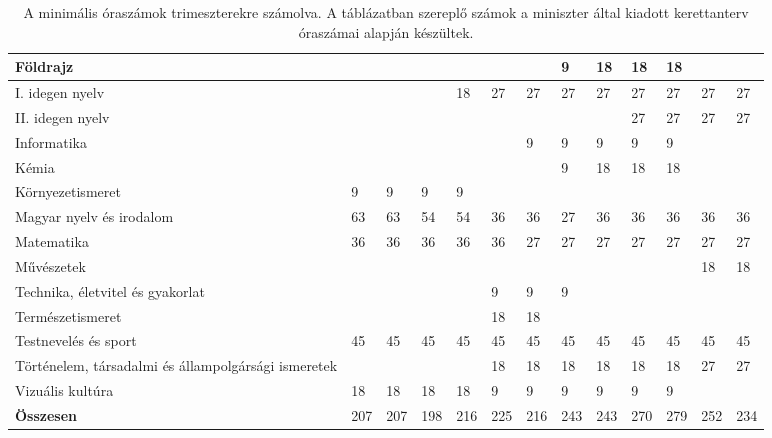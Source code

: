 \begin{landscape}
\begin{table}[]
\begin{tabular}{l|l|l|l|l|l|l|l|l|l|l|l|l}
    Földrajz                                            &     &     &     &     &     &     & 9   & 18  & 18  & 18  &     &     \\\hline
    I. idegen nyelv                                     &     &     &     & 18  & 27  & 27  & 27  & 27  & 27  & 27  & 27  & 27  \\\hline
    II. idegen nyelv                                    &     &     &     &     &     &     &     &     & 27  & 27  & 27  & 27  \\\hline
    Informatika                                         &     &     &     &     &     & 9   & 9   & 9   & 9   & 9   &     &     \\\hline
    Kémia                                               &     &     &     &     &     &     & 9   & 18  & 18  & 18  &     &     \\\hline
    Környezetismeret                                    & 9   & 9   & 9   & 9   &     &     &     &     &     &     &     &     \\\hline
    Magyar nyelv és irodalom                            & 63  & 63  & 54  & 54  & 36  & 36  & 27  & 36  & 36  & 36  & 36  & 36  \\\hline
    Matematika                                          & 36  & 36  & 36  & 36  & 36  & 27  & 27  & 27  & 27  & 27  & 27  & 27  \\\hline
    Művészetek                                          &     &     &     &     &     &     &     &     &     &     & 18  & 18  \\\hline
    Technika, életvitel és gyakorlat                    &     &     &     &     & 9   & 9   & 9   &     &     &     &     &     \\\hline
    Természetismeret                                    &     &     &     &     & 18  & 18  &     &     &     &     &     &     \\\hline
    Testnevelés és sport                                & 45  & 45  & 45  & 45  & 45  & 45  & 45  & 45  & 45  & 45  & 45  & 45  \\\hline
    Történelem, társadalmi és állampolgársági ismeretek &     &     &     &     & 18  & 18  & 18  & 18  & 18  & 18  & 27  & 27  \\\hline
    Vizuális kultúra                                    & 18  & 18  & 18  & 18  & 9   & 9   & 9   & 9   & 9   & 9   &     &     \\\hline \hline
    \textbf{Összesen}                                   & 207 & 207 & 198 & 216 & 225 & 216 & 243 & 243 & 270 & 279 & 252 & 234
    

  \end{tabular}
  \caption{A minimális óraszámok trimeszterekre számolva. A táblázatban szereplő számok a miniszter által kiadott kerettanterv óraszámai alapján készültek.}  
  \label{tbl:oraszamok}
\end{table}

\end{landscape}